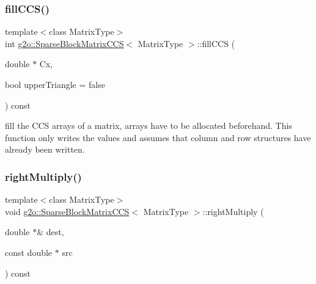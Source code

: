 \subsubsection{\texorpdfstring{fill\+C\+C\+S()}{fillCCS()}\hspace{0.1cm}{\footnotesize\ttfamily [2/2]}}
{\footnotesize\ttfamily template$<$class Matrix\+Type$>$ \\
int \mbox{\hyperlink{classg2o_1_1_sparse_block_matrix_c_c_s}{g2o\+::\+Sparse\+Block\+Matrix\+C\+CS}}$<$ Matrix\+Type $>$\+::fill\+C\+CS (\begin{DoxyParamCaption}\item[{double $\ast$}]{Cx,  }\item[{bool}]{upper\+Triangle = {\ttfamily false} }\end{DoxyParamCaption}) const\hspace{0.3cm}{\ttfamily [inline]}}

fill the C\+CS arrays of a matrix, arrays have to be allocated beforehand. This function only writes the values and assumes that column and row structures have already been written. \mbox{\label{classg2o_1_1_sparse_block_matrix_c_c_s_ade50ae61556e057549a64962b55ec194}} 
\subsubsection{\texorpdfstring{right\+Multiply()}{rightMultiply()}}
{\footnotesize\ttfamily template$<$class Matrix\+Type$>$ \\
void \mbox{\hyperlink{classg2o_1_1_sparse_block_matrix_c_c_s}{g2o\+::\+Sparse\+Block\+Matrix\+C\+CS}}$<$ Matrix\+Type $>$\+::right\+Multiply (\begin{DoxyParamCaption}\item[{double $\ast$\&}]{dest,  }\item[{const double $\ast$}]{src }\end{DoxyParamCaption}) const\hspace{0.3cm}{\ttfamily [inline]}}

\mbox{\label{classg2o_1_1_sparse_block_matrix_c_c_s_aa687d275090226a00f2685d66d134fcd}} 
